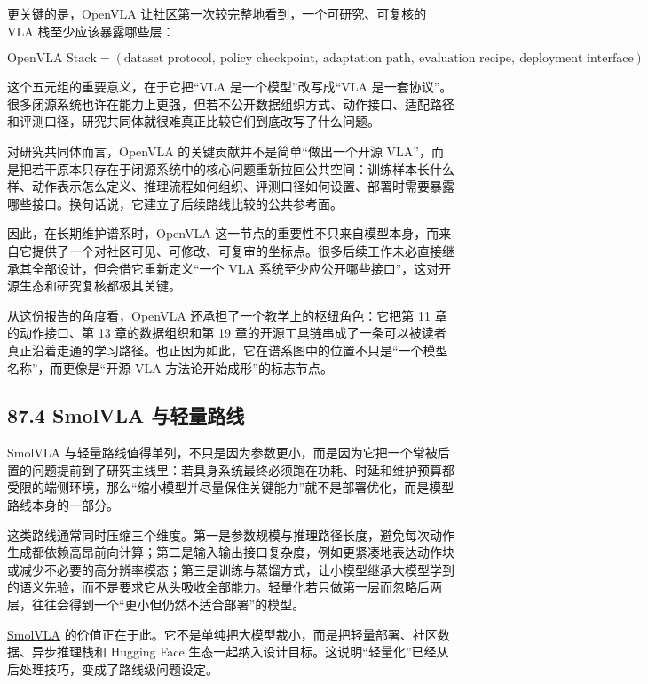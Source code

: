 更关键的是，OpenVLA 让社区第一次较完整地看到，一个可研究、可复核的 VLA 栈至少应该暴露哪些层：

\begingroup
\scriptsize
\begin{equation*}
\text{OpenVLA Stack} = (\text{dataset protocol},\ \text{policy checkpoint},\ \text{adaptation path},\ \text{evaluation recipe},\ \text{deployment interface})
\end{equation*}
\endgroup

这个五元组的重要意义，在于它把“VLA 是一个模型”改写成“VLA 是一套协议”。很多闭源系统也许在能力上更强，但若不公开数据组织方式、动作接口、适配路径和评测口径，研究共同体就很难真正比较它们到底改写了什么问题。

对研究共同体而言，OpenVLA 的关键贡献并不是简单“做出一个开源 VLA”，而是把若干原本只存在于闭源系统中的核心问题重新拉回公共空间：训练样本长什么样、动作表示怎么定义、推理流程如何组织、评测口径如何设置、部署时需要暴露哪些接口。换句话说，它建立了后续路线比较的公共参考面。

因此，在长期维护谱系时，OpenVLA 这一节点的重要性不只来自模型本身，而来自它提供了一个对社区可见、可修改、可复审的坐标点。很多后续工作未必直接继承其全部设计，但会借它重新定义“一个 VLA 系统至少应公开哪些接口”，这对开源生态和研究复核都极其关键。

从这份报告的角度看，OpenVLA 还承担了一个教学上的枢纽角色：它把第 11 章的动作接口、第 13 章的数据组织和第 19 章的开源工具链串成了一条可以被读者真正沿着走通的学习路径。也正因为如此，它在谱系图中的位置不只是“一个模型名称”，而更像是“开源 VLA 方法论开始成形”的标志节点。

\subsection*{87.4 SmolVLA 与轻量路线}


SmolVLA 与轻量路线值得单列，不只是因为参数更小，而是因为它把一个常被后置的问题提前到了研究主线里：若具身系统最终必须跑在功耗、时延和维护预算都受限的端侧环境，那么“缩小模型并尽量保住关键能力”就不是部署优化，而是模型路线本身的一部分。

这类路线通常同时压缩三个维度。第一是参数规模与推理路径长度，避免每次动作生成都依赖高昂前向计算；第二是输入输出接口复杂度，例如更紧凑地表达动作块或减少不必要的高分辨率模态；第三是训练与蒸馏方式，让小模型继承大模型学到的语义先验，而不是要求它从头吸收全部能力。轻量化若只做第一层而忽略后两层，往往会得到一个“更小但仍然不适合部署”的模型。

\href{https://arxiv.org/abs/2506.01844}{SmolVLA} 的价值正在于此。它不是单纯把大模型裁小，而是把轻量部署、社区数据、异步推理栈和 Hugging Face 生态一起纳入设计目标。这说明“轻量化”已经从后处理技巧，变成了路线级问题设定。

